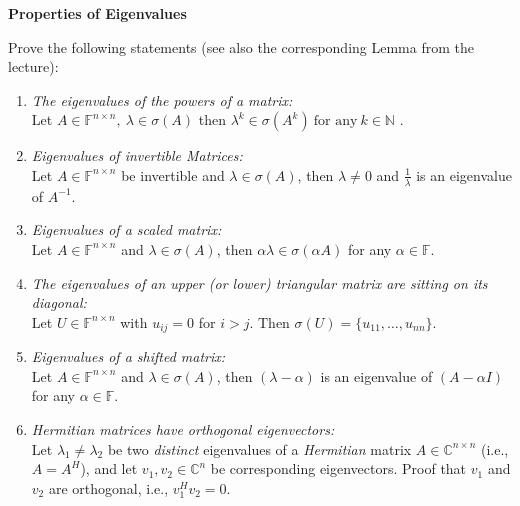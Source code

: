 \textbf{Properties of Eigenvalues}

Prove the following statements (see also the corresponding Lemma from the lecture):
\begin{enumerate}
	\item  \textit{The eigenvalues of the powers of a matrix:}\\ 
	Let $A \in \mathbb{F}^{n\times n} ,~\lambda \in \sigma(A)$ then $\lambda^k \in \sigma(A^k)~\text{for any}~k\in \mathbb{N}$ .
	\item	\textit{Eigenvalues of invertible Matrices:}\\ Let $A\in \mathbb{F}^{n \times n}$ be invertible and $\lambda \in \sigma(A)$, then $\lambda \neq 0$ and $\frac{1}{\lambda}$ is an eigenvalue of $A^{-1}$.
	\item \textit{Eigenvalues of a scaled matrix:}\\ 
	Let $A\in \mathbb{F}^{n \times n}$ and $\lambda \in \sigma(A)$, then $\alpha\lambda \in \sigma(\alpha A)$ for any $\alpha \in \mathbb{F}$.
	\item \textit{The eigenvalues of an upper (or lower) triangular matrix are sitting on its diagonal:}\\ 
	Let $U\in \mathbb{F}^{n \times n}$ with $u_{ij} = 0$ for $i > j$. Then $\sigma(U) = \{u_{11}, \ldots, u_{nn}\}$.
	\item\textit{Eigenvalues of a shifted matrix:}\\ Let $A\in \mathbb{F}^{n \times n}$ and $\lambda \in \sigma(A)$, then $(\lambda - \alpha)$ is an eigenvalue of $(A - \alpha I)$ for any $\alpha \in \mathbb{F}$.
	\item \textit{Hermitian matrices have orthogonal eigenvectors:} \\
	Let $\lambda_1 \neq \lambda_2$ be two \textit{distinct} eigenvalues of a \textit{Hermitian} matrix $A \in \mathbb{C}^{n \times n}$ (i.e., $A = A^H$), and let 
$v_1, v_2 \in \mathbb{C}^n$ be corresponding eigenvectors. Proof that $v_1$ and $v_2$ are orthogonal, i.e., $v_1^H v_2 = 0$.
\end{enumerate}
